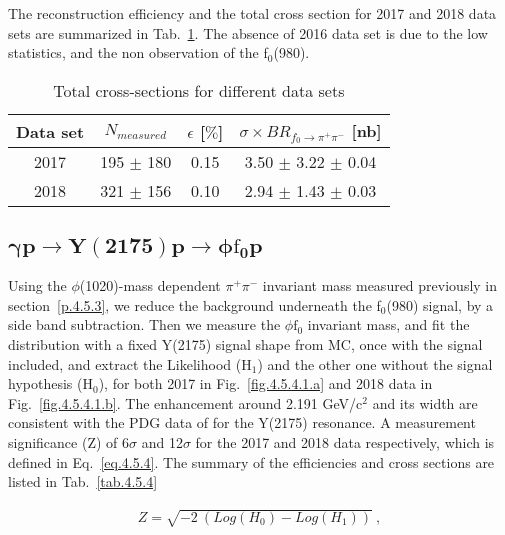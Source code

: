 The reconstruction efficiency and the total cross section for 2017 and 2018 data sets are summarized in Tab.~\ref{tab.4.5.3}.
The absence of 2016 data set is due to the low statistics, and the non observation of the f$_0$(980).

\begin{table}[!htbp]
    \centering
    \caption{Total cross-sections for different data sets}
    \label{tab.4.5.3}
    \begin{tabular}{|c|c|c|c|}
        \hline
        Data set & $N_{measured}$ & $\epsilon$ [$\%$] & $\sigma \times BR_{f_{0}\rightarrow\pi^{+}\pi^{-}}$ [nb] \\
        \hline
        2017 & 195 $\pm$ 180 & 0.15 & 3.50 $\pm$ 3.22 $\pm$ 0.04 \\
        \hline
        2018 & 321 $\pm$ 156 & 0.10 & 2.94 $\pm$ 1.43 $\pm$ 0.03 \\
        \hline
    \end{tabular}
\end{table}

\subsection{\texorpdfstring{$\bm{\gamma p \rightarrow Y(2175) p \rightarrow \phi \mathrm{f}_0 p}$}{}}
\label{p.4.5.4}

Using the $\phi$(1020)-mass dependent $\pi^+ \pi^-$ invariant mass measured previously in section~\ref{p.4.5.3}, we reduce the background underneath the f$_0$(980) signal, by a side band subtraction. Then we measure the $\phi \mathrm{f}_0$ invariant mass, and fit the distribution with a fixed Y(2175) signal shape from MC, once with the signal included, and extract the Likelihood (H$_1$) and the other one without the signal hypothesis (H$_0$), for both 2017 in Fig.~\ref{fig.4.5.4.1.a} and 2018 data in Fig.~\ref{fig.4.5.4.1.b}. The enhancement around 2.191 GeV/c$^2$ and its width are consistent with the PDG data of for the Y(2175) resonance. A measurement significance (Z) of 6$\sigma$ and 12$\sigma$ for the 2017 and 2018 data respectively, which is defined in Eq.~\ref{eq.4.5.4}. The summary of the efficiencies and cross sections are listed in Tab.~\ref{tab.4.5.4}

\begin{equation}
    \label{eq.4.5.4}
    \begin{aligned}
        Z = \sqrt{-2 ~(Log(H_{0}) - Log(H_{1}))}~,
    \end{aligned}
\end{equation}

